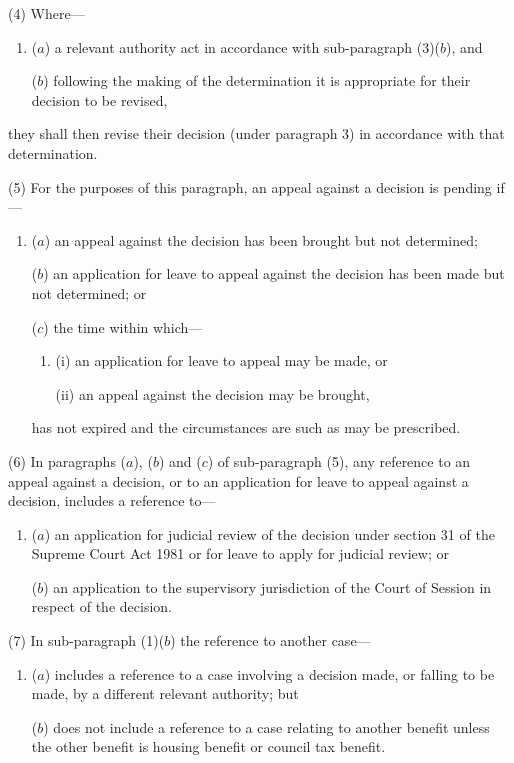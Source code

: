 \documentclass[12pt,a4paper]{article}
\begin{document}
(4) Where—
\begin{enumerate}\item[]
($a$) a relevant authority act in accordance with sub-paragraph (3)($b$), and

($b$) following the making of the determination it is appropriate for their decision to be revised,
\end{enumerate}
they shall then revise their decision (under paragraph 3) in accordance with that determination.

(5) For the purposes of this paragraph, an appeal against a decision is pending if—
\begin{enumerate}\item[]
($a$) an appeal against the decision has been brought but not determined;

($b$) an application for leave to appeal against the decision has been made but not determined; or

($c$) the time within which—
\begin{enumerate}\item[]
(i) an application for leave to appeal may be made, or

(ii) an appeal against the decision may be brought,
\end{enumerate}
has not expired and the circumstances are such as may be prescribed.
\end{enumerate}

(6) In paragraphs ($a$), ($b$)  and ($c$)  of sub-paragraph (5), any reference to an appeal against a decision, or to an application for leave to appeal against a decision, includes a reference to—
\begin{enumerate}\item[]
($a$) an application for judicial review of the decision under section 31 of the Supreme Court Act 1981 or for leave to apply for judicial review; or

($b$) an application to the supervisory jurisdiction of the Court of Session in respect of the decision.
\end{enumerate}

(7) In sub-paragraph (1)($b$)  the reference to another case—
\begin{enumerate}\item[]
($a$) includes a reference to a case involving a decision made, or falling to be made, by a different relevant authority; but

($b$) does not include a reference to a case relating to another benefit unless the other benefit is housing benefit or council tax benefit.
\end{enumerate}
\end{document}
